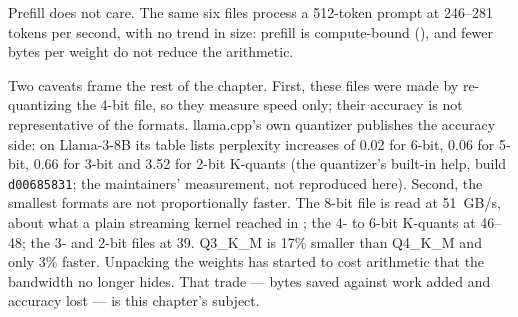 
Prefill does not care. The same six files process a 512-token prompt at
246--281 tokens per second, with no trend in size: prefill is compute-bound
(), and fewer bytes per weight do not reduce the
arithmetic.

Two caveats frame the rest of the chapter. First, these files were made by
re-quantizing the 4-bit file, so they measure speed only; their accuracy is
not representative of the formats. llama.cpp's own quantizer publishes the
accuracy side: on Llama-3-8B its table lists perplexity increases of 0.02 for
6-bit, 0.06 for 5-bit, 0.66 for 3-bit and 3.52 for 2-bit K-quants (the
quantizer's built-in help, build \texttt{d00685831}; the maintainers'
measurement, not reproduced here). Second, the smallest formats are not
proportionally faster. The 8-bit file is read at 51~GB/s, about what a plain
streaming kernel reached in ; the 4- to 6-bit K-quants at
46--48; the 3- and 2-bit files at 39. Q3\_K\_M is 17\% smaller than Q4\_K\_M
and only 3\% faster. Unpacking the weights has started to cost arithmetic that
the bandwidth no longer hides. That trade --- bytes saved against work added
and accuracy lost --- is this chapter's subject.



